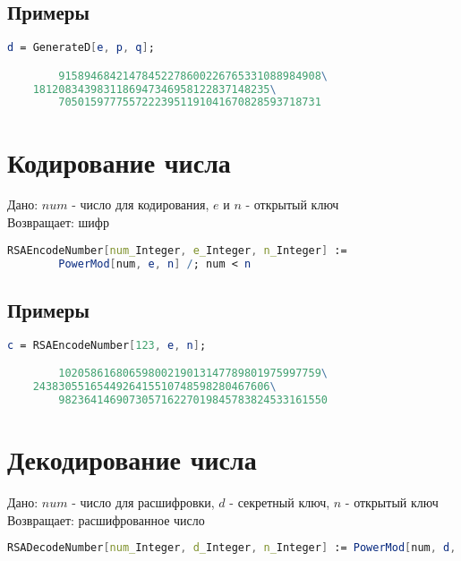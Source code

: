    	\subsection{Примеры}

    	\begin{lstlisting}[language=Mathematica,caption={
      		Пример	
    	}]
		d = GenerateD[e, p, q];

		91589468421478452278600226765331088984908\
    1812083439831186947346958122837148235\
		70501597775572223951191041670828593718731
    	\end{lstlisting}

	\section{Кодирование числа}
		Дано: $num$ - число для кодирования, $e$ и $n$ - открытый ключ \\
		Возвращает: шифр

		\begin{lstlisting}[language=Mathematica,caption={
      		Кодирование заданного числа	
    	}]
    	RSAEncodeNumber[num_Integer, e_Integer, n_Integer] := 
    	PowerMod[num, e, n] /; num < n
    	\end{lstlisting}

    	\subsection{Примеры}

    	\begin{lstlisting}[language=Mathematica,caption={
      		Пример	
    	}]
		c = RSAEncodeNumber[123, e, n];

		10205861680659800219013147789801975997759\
    2438305516544926415510748598280467606\
		982364146907305716227019845783824533161550
    	\end{lstlisting}

	\section{Декодирование числа}
		Дано: $num$ - число для расшифровки, $d$ - секретный ключ, $n$ - открытый ключ \\
		Возвращает: расшифрованное число

		\begin{lstlisting}[language=Mathematica,caption={
      		Декодирование числа	
    	}]
		RSADecodeNumber[num_Integer, d_Integer, n_Integer] := PowerMod[num, d, n]
    	\end{lstlisting}

